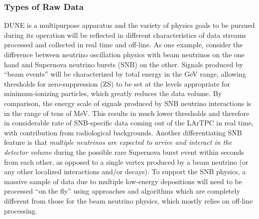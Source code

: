 \subsubsection{Types of Raw Data}
DUNE is a multipurpose apparatus and the variety of physics goals to
be pursued during its operation will be reflected in different
characteristics of data streams processed and collected in real time
and off-line.  As one example, consider the difference between
neutrino oscillation physics with beam neutrinos on the one hand and
Supernova neutrino bursts (SNB) on the other.  Signals produced by
``beam events'' will be characterized by total energy in the GeV
range, allowing thresholds for zero-suppression (ZS) to be set at the
levels appropriate for minimum-ionizing particles, which greatly
reduces the data volume. By comparison, the energy scale of signals
produced by SNB neutrino interactions is in the range of tens of
MeV. This results in much lower thresholds and therefore in
considerable rate of SNB-specific data coming out of the LArTPC in
real time, with contribution from radiological backgrounds.  Another
differentiating SNB feature is that \textit{multiple neutrinos are
  expected to arrive and interact in the detector volume} during the
possible rare Supernova burst event within seconds from each other, as
opposed to a single vertex produced by a beam neutrino (or any other
localized interactions and/or decays).  To support the SNB physics, a
massive sample of data due to multiple low-energy depositions will
need to be processed ``on the fly'' using approaches and algorithms
which are completely different from those for the beam neutrino
physics, which mostly relies on off-line processing.


